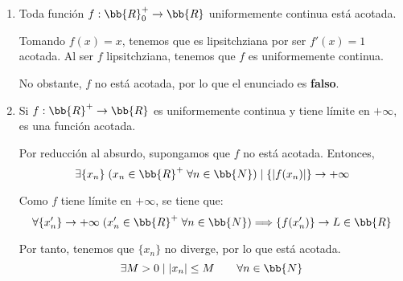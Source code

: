 \documentclass[12pt]{article}
\begin{document}
\begin{ejercicio} 
\begin{enumerate}
        Tenemos que $g$ es uniformemente continua; es decir:
        \begin{equation*}
            \forall {\varepsilon} > 0, \exists \hat{\delta}>0 \mid \text{Si } x,y\in B, \text{ con } |x-y|<\hat{\delta} \Longrightarrow |g(x)-g(y)|<{\varepsilon}
        \end{equation*}

        En particular, tomando $\hat{\varepsilon} = \hat{\delta}$, y usando que $f(A)\subset B$, la continuidad uniforme de $g$ queda:
        \begin{equation*}
            \forall {\varepsilon} > 0, \exists \hat{\varepsilon}>0 \mid \text{Si } f(x),f(y)\in B, \text{ con } |f(x)-f(y)|<\hat{\varepsilon} \Longrightarrow |g(f(x))-g(f(y))|<{\varepsilon}
        \end{equation*}

        Uniendo lo que tenemos, queda:
        \begin{equation*}
            \forall \varepsilon>0, \exists \delta>0\mid  \text{Si } x,y\in A, \text{ con } |x-y|<\delta \Longrightarrow |(g\circ f)(x)-(g\circ f)(y)|<{\varepsilon}
        \end{equation*}

        Es decir, se ha demostrado que $g\circ f$ es uniformemente continua, por lo que es \textbf{cierto}.

        \item Toda función $f:\bb{R}^+_0\to \bb{R}$ uniformemente continua está acotada.

        Tomando $f(x)=x$, tenemos que es lipsitchziana por ser $f'(x)=1$ acotada. Al ser $f$ lipsitchziana, tenemos que $f$ es uniformemente continua.

        No obstante, $f$ no está acotada, por lo que el enunciado es \textbf{falso}.

        \item Si $f:\bb{R}^+\to \bb{R}$ es uniformemente continua y tiene límite en $+\infty$, es una función acotada.

        Por reducción al absurdo, supongamos que $f$ no está acotada. Entonces, $$\exists \{x_n\}\;(x_n\in \bb{R}^+\;\forall n\in \bb{N}) \mid \{|f(x_n)|\}\to +\infty$$

        Como $f$ tiene límite en $+\infty$, se tiene que: $$\forall \{x_n'\}\to +\infty\;(x_n'\in \bb{R}^+\;\forall n\in \bb{N}) \Longrightarrow \{f(x_n')\}\to L\in \bb{R}$$

        Por tanto, tenemos que $\{x_n\}$ no diverge, por lo que está acotada.
        \begin{equation*}
            \exists M>0 \mid |x_n|\leq M \qquad \forall n\in \bb{N}
        \end{equation*}


\end{enumerate}
\end{ejercicio}
\end{document}
